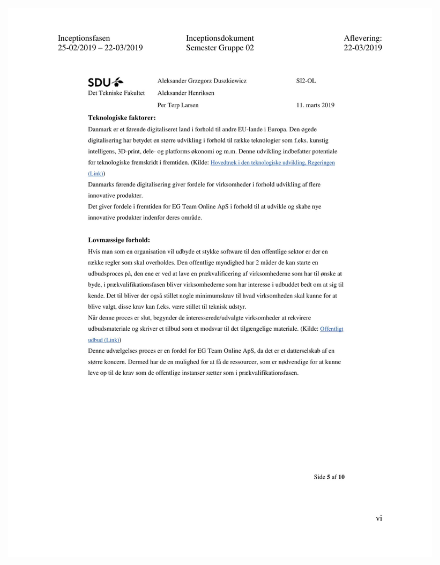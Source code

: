 \begin{figure}[hb]
  \includegraphics[scale = 0.33]{./PNG/Inceptions/Gruppe 02 + InceptionsDokument-39.jpg} 
\end{figure}

